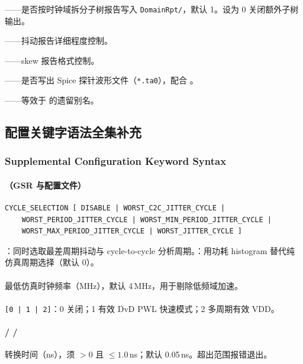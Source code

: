 ——是否按时钟域拆分子树报告写入 \texttt{DomainRpt/}，默认 1。设为 0 关闭额外子树输出。

——抖动报告详细程度控制。

——skew 报告格式控制。

——是否写出 Spice 探针波形文件（\texttt{*.ta0}），配合 。

——等效于  的遗留别名。
\subsection{配置关键字语法全集补充}
\subsubsection*{Supplemental Configuration Keyword Syntax}

\paragraph{（GSR 与配置文件）}
\begin{lstlisting}
CYCLE_SELECTION [ DISABLE | WORST_C2C_JITTER_CYCLE |
    WORST_PERIOD_JITTER_CYCLE | WORST_MIN_PERIOD_JITTER_CYCLE |
    WORST_MAX_PERIOD_JITTER_CYCLE | WORST_JITTER_CYCLE ]
\end{lstlisting}
：同时选取最差周期抖动与 cycle-to-cycle 分析周期。：用功耗 histogram 替代纯仿真周期选择（默认 0）。

\paragraph{}
最低仿真时钟频率（MHz），默认 4\,MHz，用于剔除低频域加速。

\paragraph{}
\texttt{[0 | 1 | 2]}：0 关闭；1 有效 DvD PWL 快速模式；2 多周期有效 VDD。

\paragraph{ /  / }
转换时间（ns），须 $>0$ 且 $\le 1.0$\,ns；默认 0.05\,ns。超出范围报错退出。

